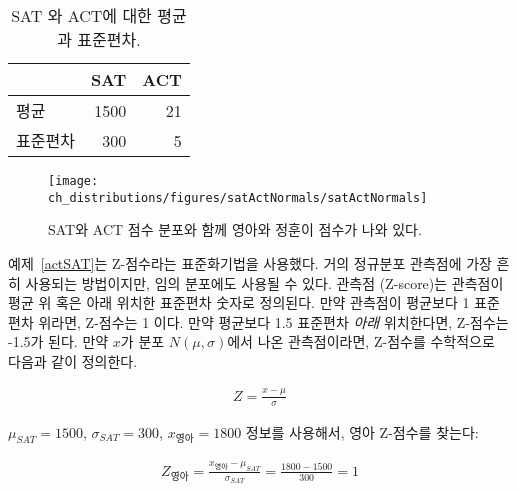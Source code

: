 \begin{table}
\centering
\begin{tabular}{l r r}
  \hline
  & SAT & ACT \\
  \hline
평균 \hspace{0.3cm} & 1500 & 21 \\
표준편차 & 300 & 5 \\
   \hline
\end{tabular}
\caption{SAT 와 ACT에 대한 평균과 표준편차.}
\label{satACTstats}
\end{table}

\begin{figure}
\centering
\texttt{[image: ch\_distributions/figures/satActNormals/satActNormals]}
\caption{SAT와 ACT 점수 분포와 함께 영아와 정훈이 점수가 나와 있다.}
\label{satActNormals}
\end{figure}


예제~\ref{actSAT}는 Z-점수라는 표준화기법을 사용했다. 거의 정규분포 관측점에 가장 흔히 사용되는 방법이지만, 임의 분포에도 사용될 수 있다. 관측점 (Z-score)는 관측점이 평균 위 혹은 아래 위치한 표준편차 숫자로 정의된다. 
만약 관측점이 평균보다 1 표준편차 위라면, Z-점수는 1 이다. 만약 평균보다 1.5 표준편차 \emph{아래} 위치한다면, Z-점수는 -1.5가 된다. 만약 $x$가 분포 $N(\mu, \sigma)$에서 나온 관측점이라면, Z-점수를 수학적으로 다음과 같이 정의한다.

\begin{eqnarray*}
Z = \frac{x-\mu}{\sigma}
\end{eqnarray*}

$\mu_{SAT}=1500$, $\sigma_{SAT}=300$, $x_{영아}=1800$ 정보를 사용해서, 영아 Z-점수를 찾는다:

\begin{eqnarray*}
Z_{영아} = \frac{x_{영아} - \mu_{SAT}}{\sigma_{SAT}} = \frac{1800-1500}{300} = 1
\end{eqnarray*}

